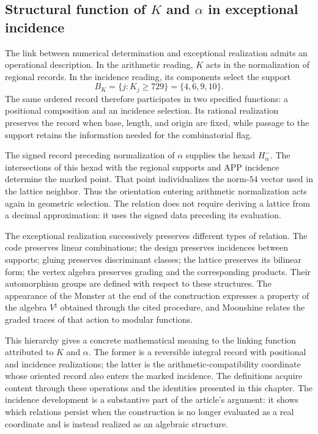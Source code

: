 \subsection{Structural function of \texorpdfstring{\(K\) and \(\alpha\)}{K and alpha} in exceptional incidence}

The link between numerical determination and exceptional realization
admits an operational description. In the arithmetic reading, \(K\)
acts in the normalization of regional records. In the incidence
reading, its components select the support
\[
 B_K=\{j:K_j\geq729\}=\{4,6,9,10\}.
\]
The same ordered record therefore participates in two specified
functions: a positional composition and an incidence selection.
Its rational realization preserves the record when base,
length, and origin are fixed, while passage to the support retains the information
needed for the combinatorial flag.

The signed record preceding normalization of \(\alpha\) supplies
the hexad \(H_\alpha^-\). The intersections of this hexad with the
regional supports and APP incidence determine the marked
point. That point individualizes the norm-\(54\) vector used
in the lattice neighbor. Thus the orientation entering arithmetic
normalization acts again in geometric selection.
The relation does not require deriving a lattice from a decimal
approximation: it uses the signed data preceding its evaluation.

The exceptional realization successively preserves different types of
relation. The code preserves linear combinations; the design preserves
incidences between supports; gluing preserves discriminant classes; the
lattice preserves its bilinear form; the vertex algebra preserves grading
and the corresponding products. Their automorphism groups
are defined with respect to these structures. The appearance of the Monster at
the end of the construction expresses a property of the algebra
\(V^\natural\) obtained through the cited procedure, and Moonshine
relates the graded traces of that action to modular functions.

This hierarchy gives a concrete mathematical meaning to the
linking function attributed to \(K\) and \(\alpha\). The former is a
reversible integral record with positional and incidence
realizations; the latter is the arithmetic-compatibility coordinate
whose oriented record also enters the marked incidence.
The definitions acquire content through these operations and the
identities presented in this chapter. The incidence development
is a substantive part of the article's argument: it shows which relations
persist when the construction is no longer evaluated as a real
coordinate and is instead realized as an algebraic structure.
